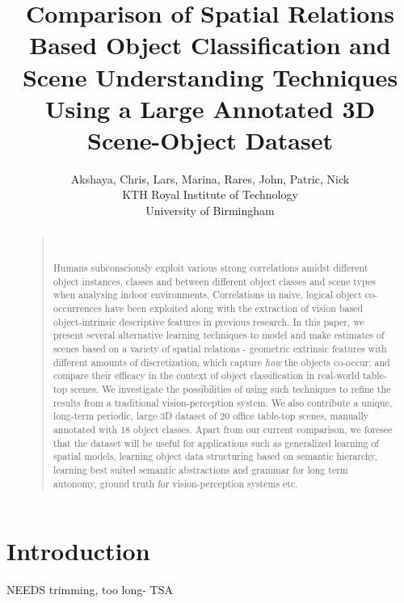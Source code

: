 \documentclass[letterpaper]{article}
\begin{document}
%
\title{Comparison of Spatial Relations Based Object Classification and Scene Understanding Techniques Using a Large Annotated 3D Scene-Object Dataset
}
\author{Akshaya, Chris, Lars, Marina, Rares, John, Patric, Nick\\
KTH Royal Institute of Technology\\
University of Birmingham
}
\maketitle
\begin{abstract}
\begin{quote}\

Humans subconsciously exploit various strong correlations amidst different object instances, classes and between different object classes and scene types when analysing indoor environments. Correlations in naive, logical object co-occurrences have been exploited along with the extraction of vision based object-intrinsic descriptive features in previous research. In this paper, we present several alternative learning techniques to model and make estimates of scenes based on a variety of spatial relations - geometric extrinsic features with different amounts of discretization, which capture \textit{how} the objects co-occur; and compare their efficacy in the context of object classification in real-world table-top scenes. We investigate the possibilities of using such techniques to refine the results from a traditional vision-perception system. We also contribute a unique, long-term periodic, large 3D dataset of 20 office table-top scenes, manually annotated with 18 object classes. Apart from our current comparison, we foresee that the dataset will be useful for applications such as generalized learning of spatial models, learning object data structuring based on semantic hierarchy, learning best suited semantic abstractions and grammar for long term autonomy, ground truth for vision-perception systems etc.
\end{quote}
\end{abstract}

\section{Introduction}
\label{sec:Introduction}

{\color{red}NEEDS trimming, too long- TSA} 
\end{document}
